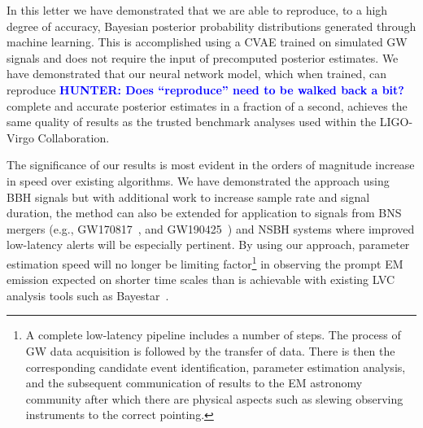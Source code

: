 \documentclass[%
showpacs,
nofootinbib,
 amsmath,amssymb,
 aps,
 twocolumn,
 prl,
 reprint,
floatfix,
]{revtex4-1}
\newcommand{\hunter}[1]{\textbf{\textcolor{blue}{HUNTER: #1}}}
\begin{document}
%
%

%
%
%
In this letter we have demonstrated that we are able to reproduce, to a high
degree of accuracy, Bayesian posterior probability distributions generated
through machine learning. This is accomplished using a \ac{CVAE} trained on
simulated \ac{GW} signals and does not require the input of precomputed
posterior estimates. We have demonstrated that our neural network model, which
when trained, can reproduce \hunter{Does ``reproduce'' need to be walked back 
a bit?} complete and accurate posterior estimates in
a fraction of a second, achieves the same quality of results as the
trusted benchmark analyses used within the LIGO-Virgo Collaboration.

%
%
The significance of our results is most evident in the orders of magnitude
increase in speed over existing algorithms. We have demonstrated the approach
using \ac{BBH} signals but with additional work to increase sample rate
and signal duration, the method can also be extended for application to
signals from \ac{BNS} mergers (e.g., GW170817~\cite{PhysRevLett.119.161101},
and GW190425~\cite{2020ApJ...892L...3A}) and \ac{NSBH} systems where
improved low-latency alerts will be especially pertinent. By using our
approach, parameter estimation speed will no longer be limiting
factor\footnote{A complete low-latency pipeline includes a number of
steps. The process of \ac{GW} data acquisition is followed by the transfer of
data. There is then the corresponding candidate event identification,
parameter estimation analysis, and the subsequent communication of results to
the \ac{EM} astronomy community after which there are physical aspects such as
slewing observing instruments to the correct pointing.} in observing the prompt
\ac{EM} emission expected on shorter time scales than is achievable with
existing \ac{LVC} analysis tools such as Bayestar~\cite{2016PhRvD..93b4013S}.
\end{document}

